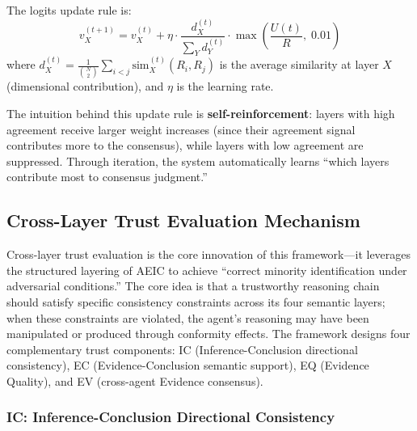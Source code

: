 \documentclass[12pt,a4paper]{article}
\begin{document}
The logits update rule is:
\begin{equation}\label{eq:weight_update}
v_X^{(t+1)} = v_X^{(t)} + \eta \cdot \frac{d_X^{(t)}}{\sum_Y d_Y^{(t)}} \cdot \max\!\left(\frac{U(t)}{R},\; 0.01\right)
\end{equation}
where $d_X^{(t)} = \frac{1}{\binom{N}{2}} \sum_{i<j} \text{sim}_X^{(t)}(R_i, R_j)$ is the average similarity at layer $X$ (dimensional contribution), and $\eta$ is the learning rate.

The intuition behind this update rule is \textbf{self-reinforcement}: layers with high agreement receive larger weight increases (since their agreement signal contributes more to the consensus), while layers with low agreement are suppressed. Through iteration, the system automatically learns ``which layers contribute most to consensus judgment.''

\subsection{Cross-Layer Trust Evaluation Mechanism}\label{sec:trust}

Cross-layer trust evaluation is the core innovation of this framework---it leverages the structured layering of AEIC to achieve ``correct minority identification under adversarial conditions.'' The core idea is that a trustworthy reasoning chain should satisfy specific consistency constraints across its four semantic layers; when these constraints are violated, the agent's reasoning may have been manipulated or produced through conformity effects. The framework designs four complementary trust components: IC (Inference-Conclusion directional consistency), EC (Evidence-Conclusion semantic support), EQ (Evidence Quality), and EV (cross-agent Evidence consensus).

\subsubsection{IC: Inference-Conclusion Directional Consistency}
\end{document}
